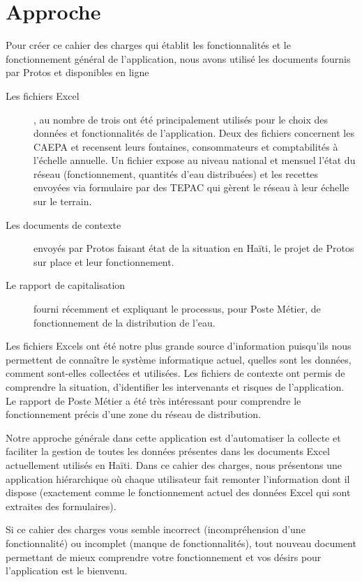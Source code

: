 \documentclass[a4paper, 11pt]{article}
\begin{document}
\section{Approche}
  Pour créer ce cahier des charges qui établit les fonctionnalités et le fonctionnement général de l'application, nous avons utilisé les documents fournis par Protos et disponibles en ligne
  \begin{description}
    \item[Les fichiers Excel], au nombre de trois ont été principalement utilisés pour le choix des données et fonctionnalités de l'application. Deux des fichiers concernent les CAEPA et recensent leurs fontaines, consommateurs et comptabilités à l'échelle annuelle. Un fichier expose au niveau national et mensuel l'état du réseau (fonctionnement, quantités d'eau distribuées) et les recettes envoyées via formulaire par des TEPAC qui gèrent le réseau à leur échelle sur le terrain.
    \item[Les documents de contexte] envoyés par Protos faisant état de la situation en Haïti, le projet de Protos sur place et leur fonctionnement.
    \item[Le rapport de capitalisation] fourni récemment et expliquant le processus, pour Poste Métier, de fonctionnement de la distribution de l'eau.
  \end{description}
  Les fichiers Excels ont été notre plus grande source d'information puisqu'ils nous permettent de connaître le système informatique actuel, quelles sont les données, comment sont-elles collectées et utilisées.
  Les fichiers de contexte ont permis de comprendre la situation, d'identifier les intervenants et risques de l'application.
  Le rapport de Poste Métier a été très intéressant pour comprendre le fonctionnement précis d'une zone du réseau de distribution.

  Notre approche générale dans cette application est d'automatiser la collecte et faciliter la gestion de toutes les données présentes dans les documents Excel actuellement utilisés en Haïti. Dans ce cahier des charges, nous présentons une application hiérarchique où chaque utilisateur fait remonter l'information dont il dispose (exactement comme le fonctionnement actuel des données Excel qui sont extraites des formulaires).

  \begin{shaded}
    Si ce cahier des charges vous semble incorrect (incompréhension d'une fonctionnalité) ou incomplet (manque de fonctionnalités), tout nouveau document permettant de mieux comprendre votre fonctionnement et vos désirs pour l'application est le bienvenu.
  \end{shaded}
\end{document}
